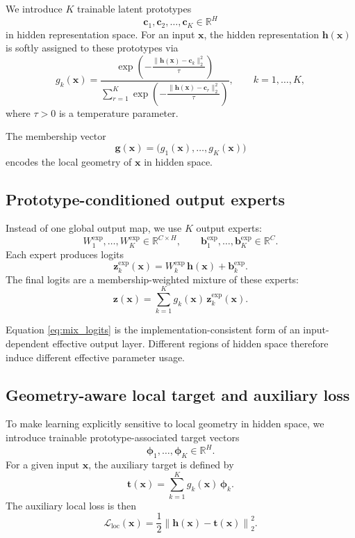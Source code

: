 \documentclass{article}
\theoremstyle{definition}
\theoremstyle{remark}
\def\RR{\mathbb{R}}
\begin{document}
We introduce $K$ trainable latent prototypes
\[
\mathbf{c}_1,\mathbf{c}_2,\dots,\mathbf{c}_K \in \RR^H
\]
in hidden representation space. For an input $\mathbf{x}$, the hidden representation $\mathbf{h}(\mathbf{x})$ is softly assigned to these prototypes via
\begin{equation}
g_k(\mathbf{x})
=
\frac{
\exp\!\left(
-\frac{\|\mathbf{h}(\mathbf{x})-\mathbf{c}_k\|_2^2}{\tau}
\right)
}{
\sum_{r=1}^{K}
\exp\!\left(
-\frac{\|\mathbf{h}(\mathbf{x})-\mathbf{c}_r\|_2^2}{\tau}
\right)
},
\qquad k=1,\dots,K,
\label{eq:gating}
\end{equation}
where $\tau>0$ is a temperature parameter.

The membership vector
\[
\mathbf{g}(\mathbf{x})=\bigl(g_1(\mathbf{x}),\dots,g_K(\mathbf{x})\bigr)
\]
encodes the local geometry of $\mathbf{x}$ in hidden space.

\subsection{Prototype-conditioned output experts}

Instead of one global output map, we use $K$ output experts:
\[
W_1^{\mathrm{exp}},\dots,W_K^{\mathrm{exp}} \in \RR^{C\times H},
\qquad
\mathbf{b}_1^{\mathrm{exp}},\dots,\mathbf{b}_K^{\mathrm{exp}} \in \RR^C.
\]
Each expert produces logits
\begin{equation}
\mathbf{z}_k^{\mathrm{exp}}(\mathbf{x})
=
W_k^{\mathrm{exp}}\,\mathbf{h}(\mathbf{x})+\mathbf{b}_k^{\mathrm{exp}}.
\label{eq:expert_logits}
\end{equation}
The final logits are a membership-weighted mixture of these experts:
\begin{equation}
\mathbf{z}(\mathbf{x})
=
\sum_{k=1}^{K}
g_k(\mathbf{x})\,\mathbf{z}_k^{\mathrm{exp}}(\mathbf{x}).
\label{eq:mix_logits}
\end{equation}

Equation \eqref{eq:mix_logits} is the implementation-consistent form of an input-dependent effective output layer. Different regions of hidden space therefore induce different effective parameter usage.

\subsection{Geometry-aware local target and auxiliary loss}

To make learning explicitly sensitive to local geometry in hidden space, we introduce trainable prototype-associated target vectors
\[
\boldsymbol{\phi}_1,\dots,\boldsymbol{\phi}_K \in \RR^H.
\]
For a given input $\mathbf{x}$, the auxiliary target is defined by
\begin{equation}
\mathbf{t}(\mathbf{x})
=
\sum_{k=1}^{K}
g_k(\mathbf{x})\,\boldsymbol{\phi}_k.
\label{eq:localtarget}
\end{equation}
The auxiliary local loss is then
\begin{equation}
\mathcal{L}_{\mathrm{loc}}(\mathbf{x})
=
\frac{1}{2}
\left\|
\mathbf{h}(\mathbf{x})-\mathbf{t}(\mathbf{x})
\right\|_2^2.
\label{eq:locloss}
\end{equation}
\end{document}
